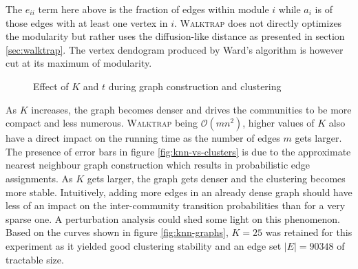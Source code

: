The $e_{ii}$ term here above is the fraction of edges within module $i$ while $a_i$ is of those edges with at least one vertex in $i$. \textsc{Walktrap} does not directly optimizes the modularity but rather uses the diffusion-like distance as presented in section \ref{sec:walktrap}.
The vertex dendogram produced by Ward's algorithm is however cut at its maximum of modularity. 

\begin{figure}
\centering
{}\hspace{2mm}%
\label{fig:pinball-graph}
\caption{Effect of $K$ and $t$ during graph construction and clustering}
\end{figure}

As $K$ increases, the graph becomes denser and drives the communities to be more compact and less numerous. \textsc{Walktrap} being $\mathcal{O}(mn^2)$, higher values of $K$ also have a direct impact on the running time as the number of edges $m$ gets larger. The presence of error bars in figure \ref{fig:knn-vs-clusters} is due to the approximate nearest neighbour graph construction which results in probabilistic edge assignments. As $K$ gets larger, the graph gets denser and the clustering becomes more stable. Intuitively, adding more edges in an already dense graph should have less of an impact on the inter-community transition probabilities than for a very sparse one. A perturbation analysis could shed some light on this phenomenon. Based on the curves shown in figure \ref{fig:knn-graphs}, $K=25$ was retained for this experiment as it yielded good clustering stability and an edge set $|E| = 90348$ of tractable size. 

